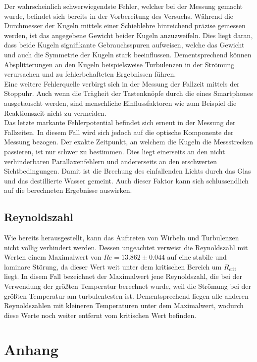 Der wahrscheinlich schwerwiegendste Fehler, welcher bei der Messung gemacht wurde, befindet sich bereits in der Vorbereitung des 
Versuchs. Während die Durchmesser der Kugeln mittels einer Schieblehre hinreichend präzise gemessen werden, ist das angegebene 
Gewicht beider Kugeln anzuzweifeln. Dies liegt daran, dass beide Kugeln signifikante Gebrauchsspuren aufweisen, welche das Gewicht 
und auch die Symmetrie der Kugeln stark beeinflussen. Dementsprechend können Absplitterungen an den Kugeln beispielsweise Turbulenzen
in der Strömung verursachen und zu fehlerbehafteten Ergebnissen führen.\\
Eine weitere Fehlerquelle verbirgt sich in der Messung der Fallzeit mittels der Stoppuhr. Auch wenn die Trägheit der Tastenknöpfe durch 
die eines Smartphones ausgetauscht werden, sind menschliche Einflussfaktoren wie zum Beispiel die Reaktionszeit nicht zu vermeiden.\\
Das letzte markante Fehlerpotential befindet sich erneut in der Messung der Fallzeiten. In diesem Fall wird sich jedoch auf die 
optische Komponente der Messung bezogen. Der exakte Zeitpunkt, an welchem die Kugeln die Messstrecken passieren, ist nur schwer zu 
bestimmen. Dies liegt einerseits an den nicht verhinderbaren Parallaxenfehlern und andererseits an den erschwerten Sichtbedingungen.
Damit ist die Brechung des einfallenden Lichts durch das Glas und das destillierte Wasser gemeint. Auch dieser Faktor kann sich 
schlussendlich auf die berechneten Ergebnisse auswirken.

\subsection{Reynoldszahl}

Wie bereits herausgestellt, kann das Auftreten von Wirbeln und Turbulenzen nicht völlig verhindert werden. Dessen ungeachtet 
verweist die Reynoldszahl mit Werten einem Maximalwert von $Re = 13.862 \pm 0.044$ auf eine stabile und laminare Störung, da dieser Wert weit unter dem kritischen 
Bereich um $R_\text{crit}$ liegt. In disem Fall bezeichnet der Maximalwert jene Reynoldszahl, die bei der Verwendung der größten 
Temperatur berechnet wurde, weil die Strömung bei der größten Temperatur am turbulentesten ist. Dementsprechend liegen alle anderen 
Reynoldszahlen mit kleineren Temperaturen unter dem Maximalwert, wodurch diese Werte noch weiter entfernt vom kritischen Wert befinden.

\section{Anhang}

